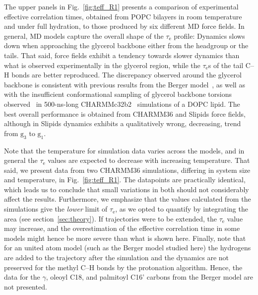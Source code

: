 \documentclass[journal=jpcbfk,manuscript=article,layout=twocolumn]{achemso}
\begin{document}
The upper panels in
Fig.~\ref{fig:teff_R1} presents a comparison of experimental effective correlation times, obtained from POPC bilayers in room temperature and under full hydration, to those produced by six different MD force fields. In general, MD models capture the overall shape of the $\tau_\mathrm{e}$ profile: Dynamics slows down when approaching the glycerol backbone either from the headgroup or the tails. That said, force fields exhibit a tendency towards slower dynamics than what is observed experimentally in the glycerol region, while the $\tau_\mathrm{e}$s of the tail C--H bonds are better reproduced. The discrepancy observed around the glycerol backbone is consistent with previous results from the Berger model~\cite{ferreira15}, as well as with the insufficient conformational sampling of glycerol backbone torsions observed~\cite{vogel12} in 500-ns-long CHARMMc32b2~\cite{schlenkrich96,feller00} simulations of a DOPC lipid. %
The best overall performance is obtained from CHARMM36 and Slipids force fields, although in Slipids dynamics exhibits a qualitatively wrong, decreasing, trend from $\mathrm g_{3}$ to $\mathrm g_{1}$. 


Note that the temperature for simulation data varies across the models, and in general the $\tau_\mathrm{e}$ values are expected to decrease with increasing temperature. That said, we present data from two CHARMM36 simulations, differing in system size and temperature, in Fig.~\ref{fig:teff_R1}. The datapoints are practically identical, which leads us to conclude that small variations in both should not considerably affect the results. Furthermore,  we emphasize that the values calculated from the simulations give the \textit{lower} limit of $\tau_\mathrm{e}$, as we opted to quantify by integrating the area (see section~\ref{sec:theory}). If trajectories were to be extended, the $\tau_\mathrm{e}$ value may increase, and the overestimation of the effective correlation time in some models might hence be more severe than what is shown here. Finally, note that for an united atom model (such as the Berger model studied here) the hydrogens are added to the trajectory after the simulation and the dynamics are not preserved for the methyl C--H bonds by the protonation algorithm. Hence, the data for the $\gamma$, oleoyl C18, and palmitoyl C16' carbons from the Berger model are not presented.
\end{document}
